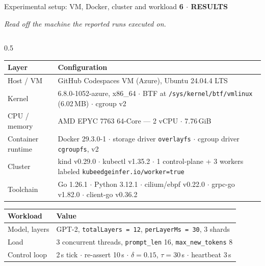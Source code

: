 \documentclass[aspectratio=169,9pt]{beamer}
\newcommand{\kicker}[1]{{\scriptsize\color{keBlue}\bfseries\MakeUppercase{#1}}\par\vspace{0.2em}}
\begin{document}
\begin{frame}[shrink=25]{Experimental setup: VM, Docker, cluster and workload}
  \kicker{6 $\cdot$ Results}
  {\scriptsize\color{keMuted}\itshape Read off the machine the reported runs
  executed on.}
  \vspace{0.4em}
  \begin{columns}[T]
    \begin{column}{0.5\textwidth}
      \scriptsize
      \begin{tabularx}{\textwidth}{@{}p{1.8cm} X@{}}
        \toprule
        \color{keNavy}\bfseries Layer & \color{keNavy}\bfseries Configuration \\
        \midrule
        Host / VM & GitHub Codespaces VM (Azure), Ubuntu 24.04.4 LTS \\
        Kernel & 6.8.0-1052-azure, x86\_64 $\cdot$ BTF at
          \texttt{/sys/kernel/btf/vmlinux} (6.02\,MB) $\cdot$ cgroup v2 \\
        CPU / memory & AMD EPYC 7763 64-Core --- 2 vCPU $\cdot$ 7.76\,GiB \\
        Container runtime & Docker 29.3.0-1 $\cdot$ storage driver
          \texttt{overlayfs} $\cdot$ cgroup driver \texttt{cgroupfs}, v2 \\
        Cluster & kind v0.29.0 $\cdot$ kubectl v1.35.2 $\cdot$ 1 control-plane
          + 3 workers labeled \texttt{kubeedgeinfer.io/worker=true} \\
        Toolchain & Go 1.26.1 $\cdot$ Python 3.12.1 $\cdot$ cilium/ebpf v0.22.0
          $\cdot$ grpc-go v1.82.0 $\cdot$ client-go v0.36.2 \\
        \bottomrule
      \end{tabularx}
      \vspace{0.5em}
      \begin{tabularx}{\textwidth}{@{}p{1.8cm} X@{}}
        \toprule
        \color{keNavy}\bfseries Workload & \color{keNavy}\bfseries Value \\
        \midrule
        Model, layers & GPT-2, \texttt{totalLayers = 12},
          \texttt{perLayerMs = 30}, 3 shards \\
        Load & 3 concurrent threads, \texttt{prompt\_len} 16,
          \texttt{max\_new\_tokens} 8 \\
        Control loop & 2\,s tick $\cdot$ re-assert 10\,s $\cdot$
          $\delta = 0.15$, $\tau = 30$\,s $\cdot$ heartbeat 3\,s \\
        \bottomrule
      \end{tabularx}
    \end{column}

\end{columns}
\end{frame}
\end{document}
